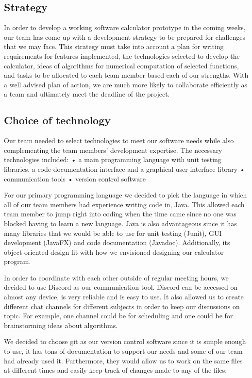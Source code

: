 \documentclass{article}
\begin{document}
\subsection{Strategy}

In order to develop a working software calculator prototype in the coming weeks, our team has come up with a development strategy to be prepared for challenges that we may face. This strategy must take into account a plan for writing requirements for features implemented, the technologies selected to develop the calculator, ideas of algorithms for numerical computation of selected functions, and tasks to be allocated to each team member based each of our strengths. With a well advised plan of action, we are much more likely to collaborate efficiently as a team and ultimately meet the deadline of the project. 


\subsection{Choice of technology}

Our team needed to select technologies to meet our software needs while also complementing the team members’ development expertise. The necessary technologies included: 
•	a main programming language with unit testing libraries, a code documentation interface and a graphical user interface library
•	communication tools
•	version control software

For our primary programming language we decided to pick the language in which all of our team members had experience writing code in, Java. This allowed each team member to jump right into coding when the time came since no one was blocked having to learn a new language. Java is also advantageous since it has many libraries that we would be able to use for unit testing (Junit), GUI development (JavaFX) and code documentation (Javadoc). Additionally, its object-oriented design fit with how we envisioned designing our calculator program. 

In order to coordinate with each other outside of regular meeting hours, we decided to use Discord as our communication tool. Discord can be accessed on almost any device, is very reliable and is easy to use. It also allowed us to create different chat channels for different subjects in order to keep our discussions on topic. For example, one channel could be for scheduling and one could be for brainstorming ideas about algorithms. 

We decided to choose git as our version control software since it is simple enough to use, it has tons of documentation to support our needs and some of our team had already used it. Furthermore, they would allow us to work on the same files at different times and easily keep track of changes made to any of the files. 
\end{document}
